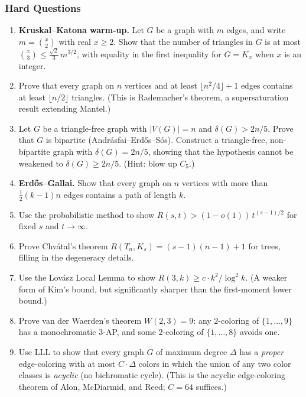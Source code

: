 \documentclass{article}
\theoremstyle{definition}
\begin{document}
\subsubsection{Hard Questions}
\begin{enumerate}[resume]
\item \textbf{Kruskal--Katona warm-up.} Let $G$ be a graph with $m$ edges, and write $m = \binom{x}{2}$ with
real $x \ge 2$. Show that the number of triangles in $G$ is at most
$\binom{x}{3} \le \tfrac{\sqrt{2}}{3}\, m^{3/2}$, with equality in the
first inequality for $G = K_x$ when $x$ is an integer.

\item Prove that every graph on $n$ vertices and at least $\lfloor n^2/4 \rfloor + 1$
edges contains at least $\lfloor n/2 \rfloor$ triangles. (This is
Rademacher's theorem, a supersaturation result extending Mantel.)

\item Let $G$ be a triangle-free graph with $|V(G)| = n$ and
$\delta(G) > 2n/5$. Prove that $G$ is bipartite
(Andr\'asfai--Erd\H{o}s--S\'os). Construct a triangle-free,
non-bipartite graph with $\delta(G) = 2n/5$, showing that the hypothesis
cannot be weakened to $\delta(G) \ge 2n/5$. (Hint: blow up $C_5$.)

\item \textbf{Erd\H{o}s--Gallai.} Show that every graph on $n$ vertices with more than
$\tfrac{1}{2}(k - 1) n$ edges contains a path of length $k$.

\item Use the probabilistic method to show $R(s, t) > (1 - o(1))\, t^{(s-1)/2}$
for fixed $s$ and $t \to \infty$.

\item Prove Chv\'atal's theorem $R(T_n, K_s) = (s - 1)(n - 1) + 1$ for trees,
filling in the degeneracy details.

\item Use the Lov\'asz Local Lemma to show $R(3, k) \ge c \cdot k^2 / \log^2 k$.
(A weaker form of Kim's bound, but significantly sharper than the
first-moment lower bound.)

\item Prove van der Waerden's theorem $W(2, 3) = 9$: any $2$-coloring of
$\{1, \dots, 9\}$ has a monochromatic $3$-AP, and some $2$-coloring
of $\{1, \dots, 8\}$ avoids one.

\item Use LLL to show that every graph $G$ of maximum degree $\Delta$ has a
\emph{proper} edge-coloring with at most $C \cdot \Delta$ colors in
which the union of any two color classes is \emph{acyclic} (no
bichromatic cycle). (This is the acyclic edge-coloring theorem of Alon,
McDiarmid, and Reed; $C = 64$ suffices.)


\end{enumerate}
\end{document}
